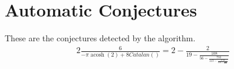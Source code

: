 \documentclass{article}%
\begin{document}
%
\normalsize%
\section{Automatic Conjectures}%
\label{sec:AutomaticConjectures}%
These are the conjectures detected by the algorithm.%
\begin{alignat*}{2}%
\frac{6}{- \pi \operatorname{acosh}{\left(2 \right)} + 8 Catalan\left(\right)} = 2 - \frac{2}{19 - \frac{108}{56 - \frac{750}{113 - \frac{2744}{190 - \frac{7290}{..}}}}}%
\end{alignat*}

%
\end{document}
